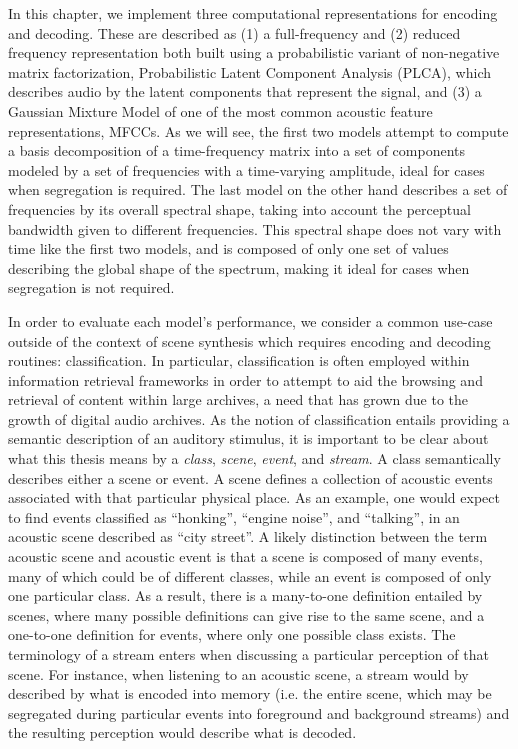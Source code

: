 \documentclass[a4paper,10pt,final]{ThesisStyle}
\begin{document}
In this chapter, we implement three computational representations for encoding and decoding.  These are described as (1) a full-frequency and (2) reduced frequency representation both built using a probabilistic variant of non-negative matrix factorization, Probabilistic Latent Component Analysis (PLCA), which describes audio by the latent components that represent the signal, and (3) a Gaussian Mixture Model of one of the most common acoustic feature representations, MFCCs.  As we will see, the first two models attempt to compute a basis decomposition of a time-frequency matrix into a set of components modeled by a set of frequencies with a time-varying amplitude, ideal for cases when segregation is required.  The last model on the other hand describes a set of frequencies by its overall spectral shape, taking into account the perceptual bandwidth given to different frequencies.  This spectral shape does not vary with time like the first two models, and is composed of only one set of values describing the global shape of the spectrum, making it ideal for cases when segregation is not required.

In order to evaluate each model's performance, we consider a common use-case outside of the context of scene synthesis which requires encoding and decoding routines: classification.  In particular, classification is often employed within information retrieval frameworks in order to attempt to aid the browsing and retrieval of content within large archives, a need that has grown due to the growth of digital audio archives.  As the notion of classification entails providing a semantic description of an auditory stimulus, it is important to be clear about what this thesis means by a \textit{class}, \textit{scene}, \textit{event}, and \textit{stream}.  A class semantically describes either a scene or event.  A scene defines a collection of acoustic events associated with that particular physical place.  As an example, one would expect to find events classified as ``honking'', ``engine noise'', and ``talking'', in an acoustic scene described as ``city street''.  A likely distinction between the term acoustic scene and acoustic event is that a scene is composed of many events, many of which could be of different classes, while an event is composed of only one particular class.  As a result, there is a many-to-one definition entailed by scenes, where many possible definitions can give rise to the same scene, and a one-to-one definition for events, where only one possible class exists.  The terminology of a stream enters when discussing a particular perception of that scene.  For instance, when listening to an acoustic scene, a stream would by described by what is encoded into memory (i.e. the entire scene, which may be segregated during particular events into foreground and background streams) and the resulting perception would describe what is decoded.  
\end{document}
